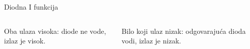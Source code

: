 \begin{frame}[label=10-s042]{Diodna I funkcija}
\setlength{\abovedisplayskip}{4pt}\setlength{\belowdisplayskip}{4pt}\setlength{\abovedisplayshortskip}{3pt}\setlength{\belowdisplayshortskip}{3pt}
\begin{columns}[T,onlytextwidth]\centering \raggedright
Oba ulaza visoka: diode ne vode, izlaz je visok.\par\bigskip
Bilo koji ulaz nizak: odgovarajuća dioda vodi, izlaz je nizak.\par\bigskip
\centering\end{columns}\medskip{}
\end{frame}
